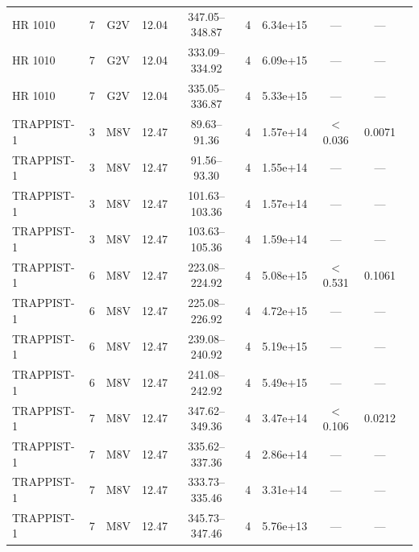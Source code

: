 \documentclass{openjournal}
\begin{document}
\begin{table}
\begin{tabularx}{\textwidth}{@{}l c c c c c c c c X@{}}
HR 1010 & 7 & G2V & 12.04 & 347.05--348.87 & 4 & 6.34e+15 & --- & --- &  \\
HR 1010 & 7 & G2V & 12.04 & 333.09--334.92 & 4 & 6.09e+15 & --- & --- &  \\
HR 1010 & 7 & G2V & 12.04 & 335.05--336.87 & 4 & 5.33e+15 & --- & --- &  \\
TRAPPIST-1 & 3 & M8V & 12.47 & 89.63--91.36 & 4 & 1.57e+14 & $<$0.036 & 0.0071 &  \\
TRAPPIST-1 & 3 & M8V & 12.47 & 91.56--93.30 & 4 & 1.55e+14 & --- & --- &  \\
TRAPPIST-1 & 3 & M8V & 12.47 & 101.63--103.36 & 4 & 1.57e+14 & --- & --- &  \\
TRAPPIST-1 & 3 & M8V & 12.47 & 103.63--105.36 & 4 & 1.59e+14 & --- & --- &  \\
TRAPPIST-1 & 6 & M8V & 12.47 & 223.08--224.92 & 4 & 5.08e+15 & $<$0.531 & 0.1061 &  \\
TRAPPIST-1 & 6 & M8V & 12.47 & 225.08--226.92 & 4 & 4.72e+15 & --- & --- &  \\
TRAPPIST-1 & 6 & M8V & 12.47 & 239.08--240.92 & 4 & 5.19e+15 & --- & --- &  \\
TRAPPIST-1 & 6 & M8V & 12.47 & 241.08--242.92 & 4 & 5.49e+15 & --- & --- &  \\
TRAPPIST-1 & 7 & M8V & 12.47 & 347.62--349.36 & 4 & 3.47e+14 & $<$0.106 & 0.0212 &  \\
TRAPPIST-1 & 7 & M8V & 12.47 & 335.62--337.36 & 4 & 2.86e+14 & --- & --- &  \\
TRAPPIST-1 & 7 & M8V & 12.47 & 333.73--335.46 & 4 & 3.31e+14 & --- & --- &  \\
TRAPPIST-1 & 7 & M8V & 12.47 & 345.73--347.46 & 4 & 5.76e+13 & --- & --- &  \\
\hline
\end{tabularx}
\end{table}
\end{document}

